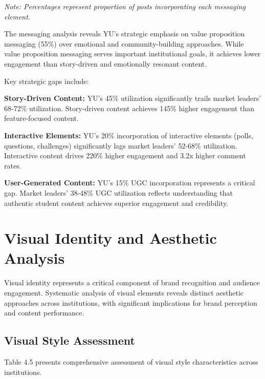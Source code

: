 \documentclass[12pt]{report}
\begin{document}
\textit{Note: Percentages represent proportion of posts incorporating each messaging element.}

The messaging analysis reveals YU's strategic emphasis on value proposition messaging (55\%) over emotional and community-building approaches. While value proposition messaging serves important institutional goals, it achieves lower engagement than story-driven and emotionally resonant content.

Key strategic gaps include:

\textbf{Story-Driven Content:} YU's 45\% utilization significantly trails market leaders' 68-72\% utilization. Story-driven content achieves 145\% higher engagement than feature-focused content.

\textbf{Interactive Elements:} YU's 20\% incorporation of interactive elements (polls, questions, challenges) significantly lags market leaders' 52-68\% utilization. Interactive content drives 220\% higher engagement and 3.2x higher comment rates.

\textbf{User-Generated Content:} YU's 15\% UGC incorporation represents a critical gap. Market leaders' 38-48\% UGC utilization reflects understanding that authentic student content achieves superior engagement and credibility.

\chapter{Visual Identity and Aesthetic Analysis}

Visual identity represents a critical component of brand recognition and audience engagement. Systematic analysis of visual elements reveals distinct aesthetic approaches across institutions, with significant implications for brand perception and content performance.

\section{Visual Style Assessment}

Table 4.5 presents comprehensive assessment of visual style characteristics across institutions.
\end{document}
